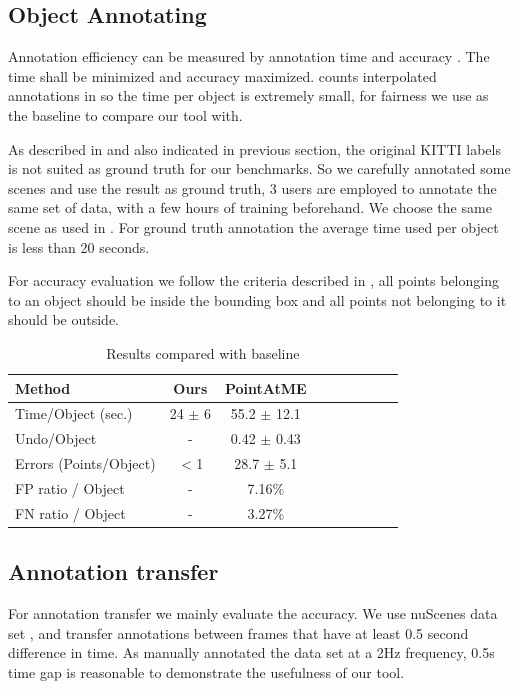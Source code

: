 \documentclass[letterpaper, 10 pt, conference]{ieeeconf}  %
\begin{document}
\subsection{Object Annotating}

Annotation efficiency can be measured by annotation time and accuracy\cite{pointatme} \cite{Zimmer20193DBA}. The time shall be minimized and accuracy maximized. \cite{Zimmer20193DBA} counts interpolated annotations in so the time per object is extremely small, for fairness we use \cite{pointatme} as the baseline to compare our tool with.

As described in \cite{pointatme} and also indicated in previous section, the original KITTI labels is not suited as ground truth for our benchmarks. So we carefully annotated some scenes and use the result as ground truth, 3 users are employed to annotate the same set of data, with a few hours of training beforehand. We choose the same scene as used in \cite{pointatme}. For ground truth annotation the average time used per object is less than 20 seconds.

For accuracy evaluation we follow the criteria  described in \cite{pointatme}, all points belonging to an object should be inside the bounding box and all points not belonging to it should be outside.

\begin{table}[h]
	\centering
	\caption{Results compared with baseline}
	\label{tab:metrics}
	\begin{tabular}{|l|c|c|c|c||c|c|c|c|}
		\hline
		\textbf{Method} & \textbf{Ours} & \textbf{PointAtME\cite{pointatme}} \\
		\hline
		\hline
		Time/Object (sec.) & 24 $\pm$ 6 & 55.2 $\pm$ 12.1\\
		\hline
		Undo/Object & - & 0.42 $\pm$ 0.43\\
		\hline
		Errors (Points/Object) & $<$1 & 28.7 $\pm$ 5.1\\
		\hline
		FP ratio / Object & - & 7.16\%\\
		\hline
		FN ratio / Object & - & 3.27\%\\
		\hline
	\end{tabular}
\end{table}


\subsection{Annotation transfer}
For annotation transfer we mainly evaluate the accuracy. We use nuScenes data set \cite{Caesar2019nuScenesAM}, and transfer annotations between frames that have at least 0.5 second difference in time. As \cite{Caesar2019nuScenesAM} \cite{Patil2019TheHD} manually annotated the data set at a 2Hz frequency, 0.5s time gap is reasonable to demonstrate the usefulness of our tool.
\end{document}
